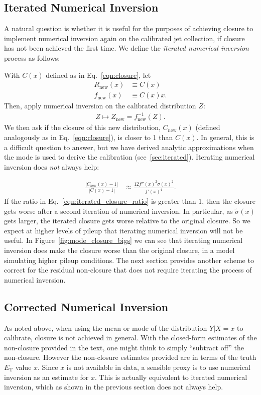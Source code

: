 \subsection{Iterated Numerical Inversion}
\label{sec:iterated_text}
A natural question is whether it is useful for the purposes of achieving closure to implement numerical inversion again on the calibrated jet collection, if closure has not been achieved the first time. We define the \emph{iterated numerical inversion} process as follows:

\vspace{5mm}

\noindent With $C(x)$ defined as in Eq.~\ref{eqn:closure}, let
\begin{align}
R_{\text{new}}(x) &\equiv C(x)\\
f_{\text{new}}(x) &\equiv C(x)x.
\end{align}
Then, apply numerical inversion on the calibrated distribution $Z$:
\begin{align}
Z\mapsto Z_\text{new} = f_{\text{new}}^{-1}(Z).
\end{align}
We then ask if the closure of this new distribution, $C_\text{new}(x)$ (defined analogously as in Eq.~\ref{eqn:closure}), is closer to 1 than $C(x)$.  In general, this is a difficult question to answer, but we have derived analytic approximations when the mode is used to derive the calibration (see~\ref{sec:iterated}).  Iterating numerical inversion does \emph{not} always help:

\begin{align}
\frac{|C_\text{new}(x)-1|}{|C(x)-1|} &\approx \frac{12f''(x)^2\tilde{\sigma}(x)^2}{f'(x)^4}\label{eqn:iterated_closure_ratio}.
\end{align}
If the ratio in Eq.~\ref{eqn:iterated_closure_ratio} is greater than 1, then the closure gets worse after a second iteration of numerical inversion.  In particular, as $\tilde{\sigma}(x)$ gets larger, the iterated closure gets worse relative to the original closure. So we expect at higher levels of pileup that iterating numerical inversion will not be useful. In Figure~\ref{fig:mode_closure_bigs} we can see that iterating numerical inversion does make the closure worse than the original closure, in a model simulating higher pileup conditions.  The next section provides another scheme to correct for the residual non-closure that does not require iterating the process of numerical inversion.

\subsection{Corrected Numerical Inversion}
\label{sec:corrected_numerical_inversion_text}
As noted above, when using the mean or mode of the distribution $Y|X=x$ to calibrate, closure is not achieved in general. With the closed-form estimates of the non-closure provided in the text, one might think to simply ``subtract off'' the non-closure. However the non-closure estimates provided are in terms of the truth $E_\text{T}$ value $x$.  Since $x$ is not available in data, a sensible proxy is to use numerical inversion as an estimate for $x$.  This is actually equivalent to iterated numerical inversion, which as shown in the previous section does not always help.

